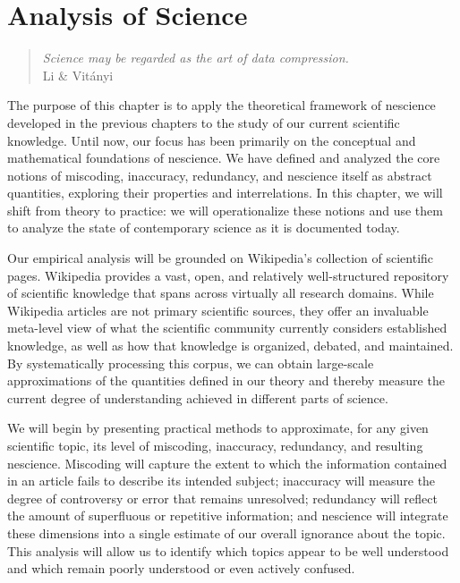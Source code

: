 %
%


\chapter{Analysis of Science}
\label{chap:Analysis_Science}

\begin{quote}
\begin{flushright}
\emph{Science may be regarded as the art of data compression.}\\
Li \& Vitányi
\end{flushright}
\end{quote}
\bigskip

The purpose of this chapter is to apply the theoretical framework of nescience developed in the previous chapters to the study of our current scientific knowledge. Until now, our focus has been primarily on the conceptual and mathematical foundations of nescience. We have defined and analyzed the core notions of miscoding, inaccuracy, redundancy, and nescience itself as abstract quantities, exploring their properties and interrelations. In this chapter, we will shift from theory to practice: we will operationalize these notions and use them to analyze the state of contemporary science as it is documented today.

Our empirical analysis will be grounded on Wikipedia’s collection of scientific pages. Wikipedia provides a vast, open, and relatively well-structured repository of scientific knowledge that spans across virtually all research domains. While Wikipedia articles are not primary scientific sources, they offer an invaluable meta-level view of what the scientific community currently considers established knowledge, as well as how that knowledge is organized, debated, and maintained. By systematically processing this corpus, we can obtain large-scale approximations of the quantities defined in our theory and thereby measure the current degree of understanding achieved in different parts of science.

We will begin by presenting practical methods to approximate, for any given scientific topic, its level of miscoding, inaccuracy, redundancy, and resulting nescience. Miscoding will capture the extent to which the information contained in an article fails to describe its intended subject; inaccuracy will measure the degree of controversy or error that remains unresolved; redundancy will reflect the amount of superfluous or repetitive information; and nescience will integrate these dimensions into a single estimate of our overall ignorance about the topic. This analysis will allow us to identify which topics appear to be well understood and which remain poorly understood or even actively confused.

